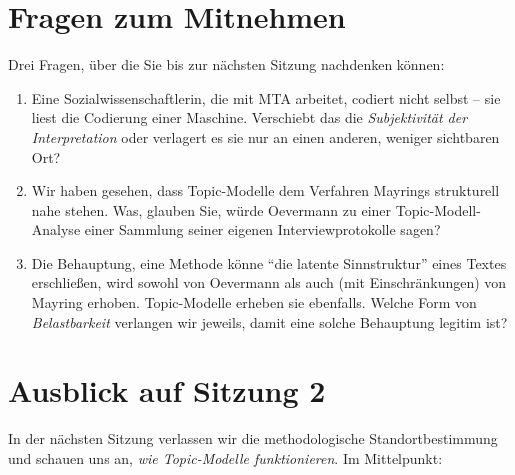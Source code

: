 \documentclass[a4paper,11pt]{article}
\begin{document}
\section{Fragen zum Mitnehmen}

Drei Fragen, über die Sie bis zur nächsten Sitzung nachdenken können:

\begin{enumerate}
\item Eine Sozialwissenschaftlerin, die mit MTA arbeitet, codiert nicht
selbst -- sie liest die Codierung einer Maschine. Verschiebt das die
\emph{Subjektivität der Interpretation} oder verlagert es sie nur an
einen anderen, weniger sichtbaren Ort?

\item Wir haben gesehen, dass Topic-Modelle dem Verfahren Mayrings
strukturell nahe stehen. Was, glauben Sie, würde Oevermann zu einer
Topic-Modell-Analyse einer Sammlung seiner eigenen Interviewprotokolle
sagen?

\item Die Behauptung, eine Methode könne \enquote{die latente
Sinnstruktur} eines Textes erschließen, wird sowohl von Oevermann als
auch (mit Einschränkungen) von Mayring erhoben. Topic-Modelle erheben
sie ebenfalls. Welche Form von \emph{Belastbarkeit} verlangen wir
jeweils, damit eine solche Behauptung legitim ist?
\end{enumerate}

\section{Ausblick auf Sitzung 2}

In der nächsten Sitzung verlassen wir die methodologische
Standortbestimmung und schauen uns an, \emph{wie Topic-Modelle
funktionieren}. Im Mittelpunkt:
\end{document}
